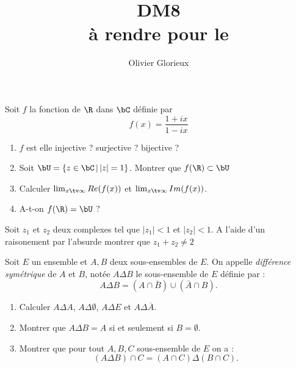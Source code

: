 \documentclass[a4paper, 11pt,reqno]{article}
\author{Olivier Glorieux}
\begin{document}
\title{DM8  \\
\small{à rendre pour le } 
}

\begin{exercice}
Soit $f$ la fonction de $\R$ dans $\bC$ définie par 
$$f(x) =\frac{1+ix}{1-ix}$$
\begin{enumerate}
\item $f$ est elle injective ? surjective ? bijective ? 
\item Soit $\bU= \{ z\in \bC\, |\,  |z|=1\} $. 
Montrer que $f(\R) \subset \bU$
\item Calculer $\lim_{x\tv \infty } Re(f(x))$ et  $\lim_{x\tv \infty } Im(f(x))$.
\item A-t-on $f(\R) = \bU$ ?
\end{enumerate}
\end{exercice}

\begin{exercice}
Soit $z_1 $ et $z_2$ deux complexes tel que $|z_1|<1 $ et $|z_2|<1$. A l'aide d'un raisonement par l'absurde montrer que $z_1+z_2\neq 2$
\end{exercice}

\begin{exercice}
Soit $E$ un ensemble et $A,B$ deux sous-ensembles de $E$. On appelle \emph{différence symétrique } de $A$ et $B$, notée $A\Delta B$ le sous-ensemble de $E$ définie par :
$$A \Delta  B =  (A\cap \bar{B})\cup \left(\bar{A}\cap B\right).$$
\begin{enumerate}
\item Calculer $A\Delta A$, $A\Delta \emptyset$, $A\Delta E$ et $A\Delta \overline{A}$.
\item Montrer que $A\Delta B= A$ si et seulement si $B=\emptyset.$
\item Montrer que pour tout $A,B,C$ sous-ensemble de $E$ on a :
$$(A\Delta B) \cap C = (A\cap C)\Delta (B\cap C).$$
\end{enumerate}
\end{exercice}
\end{document}

